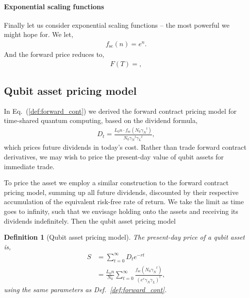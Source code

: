 \documentclass[aps, rmp, twocolumn, amsmath, amssymb, nofootinbib, superscriptaddress, longbibliography, floatfix, table-of-contents, eqsecnum]{revtex4-1}
\newcommand{\comment}[1]{{\color{blue}{\textbf{#1}}}}
\newtheorem{definition}{Definition}
\begin{document}
%
%

\paragraph{Exponential scaling functions}

Finally let us consider exponential scaling functions -- the most powerful we might hope for. We let,
\begin{align}
f_\text{sc}(n) = e^n.	
\end{align}
And the forward price reduces to,
\begin{align}
F(T) = ,
\end{align}
\comment{To do}

%
%

\subsection{Qubit asset pricing model}

In Eq.~(\ref{def:forward_cont}) we derived the forward contract pricing model for time-shared quantum computing, based on the dividend formula,
\begin{align}
D_t = \frac{L_0 n\cdot f_\text{sc}(N_0 {\gamma_N}^{t})}{N_0 {\gamma_N}^{t}{\gamma_L}^{t}},
\end{align}
which prices future dividends in today's cost. Rather than trade forward contract derivatives, we may wish to price the present-day value of qubit assets for immediate trade.

To price the asset we employ a similar construction to the forward contract pricing model, summing up all future dividends, discounted by their respective accumulation of the equivalent risk-free rate of return. We take the limit as time goes to infinity, such that we envisage holding onto the assets and receiving its dividends indefinitely. Then the qubit asset pricing model

\begin{definition}[Qubit asset pricing model] \label{def:qubit_ass_pricing}
The present-day price of a qubit asset is,	
\begin{align}
S &= \sum_{t=0}^\infty D_t e^{-rt} \nonumber \\
&= \frac{L_0 n}{N_0} \sum_{t=0}^\infty \frac{f_\text{sc}({N_0\gamma_N}^{t})}{{(e^r \gamma_N \gamma_L)}^{t}},
\end{align}	
using the same parameters as Def.~\ref{def:forward_cont}.
\end{definition}
\end{document}
